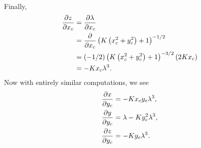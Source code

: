 \documentclass{ximera}
\begin{document}
\begin{problem}
\begin{freeResponse}
\begin{align*}
    \end{align*}
   Finally, 
    \begin{align*}
    \pp[z]{x_c} &= \pp[\lambda]{x_c}\\
    &= \pp{x_c}\left(K\left(x_c^2 + y_c^2\right)+1\right)^{-1/2}\\
    &= (-1/2)\left(K\left(x_c^2 + y_c^2\right)+1\right)^{-3/2}(2Kx_c)\\
    &= -Kx_c \lambda^3.
    \end{align*}
    Now with entirely similar computations, we see
    \begin{align*}
      \pp[x]{y_c} &= -Kx_cy_c \lambda^3,\\
      \pp[y]{y_c} &= \lambda - Ky_c^2 \lambda^3,\\
      \pp[z]{y_c} &= -Ky_c \lambda^3.
    \end{align*}
  \end{freeResponse}
\end{problem}
\end{document}
